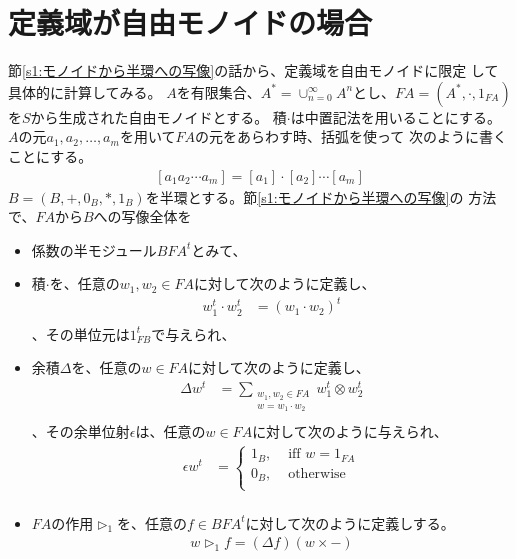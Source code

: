 \section{定義域が自由モノイドの場合}\label{s1:定義域が自由モノイドの場合} %
	節\ref{s1:モノイドから半環への写像}の話から、定義域を自由モノイドに限定
	して具体的に計算してみる。
	$A$を有限集合、$A^*=\cup_{n=0}^\infty A^n$とし、$FA=(A^*,\cdot,1_{FA})$
	を$S$から生成された自由モノイドとする。
	積$\cdot$は中置記法を用いることにする。
	$A$の元$a_1,a_2,\dots,a_m$を用いて$FA$の元をあらわす時、括弧を使って
	次のように書くことにする。
	\begin{equation*}\begin{split} %
		[a_1a_2\cdots a_m] = [a_1]\cdot[a_2]\cdots [a_m]
	\end{split}\end{equation*} %
	$B=(B,+,0_B,*,1_B)$を半環とする。節\ref{s1:モノイドから半環への写像}の
	方法で、$FA$から$B$への写像全体を
	\begin{itemize}
		\item 係数の半モジュール$BFA^t$とみて、
		\item 積$\cdot$を、任意の$w_1,w_2\in FA$に対して次のように定義し、
		\begin{equation*}\begin{split} %
			w_1^t\cdot w_2^t &= (w_1\cdot w_2)^t \\
		\end{split}\end{equation*} %
		、その単位元は$1_{FB}^t$で与えられ、
		\item 余積$\Delta$を、任意の$w\in FA$に対して次のように定義し、
		\begin{equation*}\begin{split} %
			\Delta w^t &= \sum_{\substack{w_1,w_2\in FA\\w=w_1\cdot w_2}}w_1^t\otimes w_2^t \\
		\end{split}\end{equation*} %
		、その余単位射$\epsilon$は、任意の$w\in FA$に対して次のように与えられ、
		\begin{equation*}\begin{split} %
			\epsilon w^t &= \begin{cases}
				1_B, &\text{ iff }w=1_{FA} \\
				0_B, &\text{ otherwise } \\
			\end{cases} \\
		\end{split}\end{equation*} %
		\item $FA$の作用$\rhd_1$を、任意の$f\in BFA^t$に対して次のように定義しする。
		\begin{equation*}\begin{split} %
			w\rhd_1 f = (\Delta f)(w\times -)
		\end{split}\end{equation*} %
	\end{itemize}

